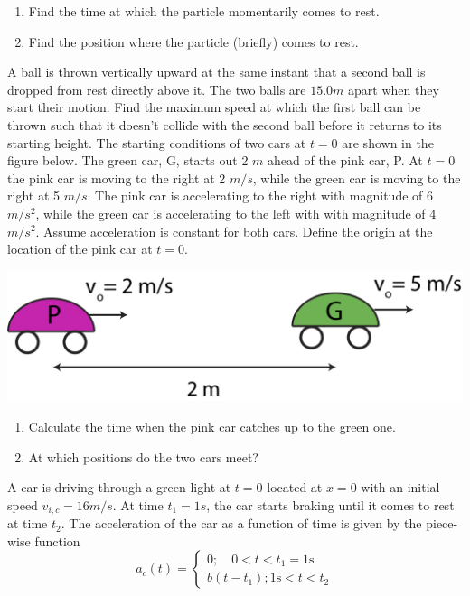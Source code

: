 \documentclass[12pt,addpoints]{exam}
\begin{document}
\begin{questions}
\begin{enumerate}[label*=(\Alph*)]
			\item Find the time at which the particle momentarily comes to rest.
			\item Find the position where the particle (briefly) comes to rest.
		\end{enumerate}
		\question[10] A ball is thrown vertically upward at the same instant that a second ball is dropped from rest directly above it. The two balls are  $15.0m$ apart when they start their motion. Find the maximum speed at which the first ball can be thrown such that it doesn't collide with the second ball before it returns to its starting height. 
		\question[15] The starting conditions of two cars at $t=0$ are shown in the figure below. The green car, G, starts out 2 $m$ ahead of the pink car, P. At $t=0$ the pink car is moving to the right at 2 $m/s$, while the green car is moving to the right at 5 $m/s$. The pink car is accelerating to the right with magnitude of 6 $m/s^2$, while the green car is accelerating to the left with with magnitude of 4 $m/s^2$. Assume acceleration is constant for both cars. Define the origin at the location of the pink car at  $t=0$.
		\begin{center}
			\includegraphics[scale=0.5]{q4.png}
		\end{center}
		\begin{enumerate}[label*=(\Alph*)]
			\item Calculate the time when the pink car catches up to the green one.
			\item At which positions do the two cars meet?
		\end{enumerate}
		\question[15] A car is driving through a green light at $t = 0$ located at $x=0$ with an initial speed $v_{i,c}=16m/s$. At time  $t_1=1s$, the car starts braking until it comes to rest at time $t_2$. The acceleration of the car as a function of time is given by the piece-wise function
		$$a_{c}(t)=\left\{\begin{array}{l} 
			0 ; \quad 0<t<t_{1}=1 \mathrm{s} \\ 
			b\left(t-t_{1}\right) ; 1 \mathrm{s}<t<t_{2} 
		\end{array}\right. \nonumber$$

\end{questions}
\end{document}
